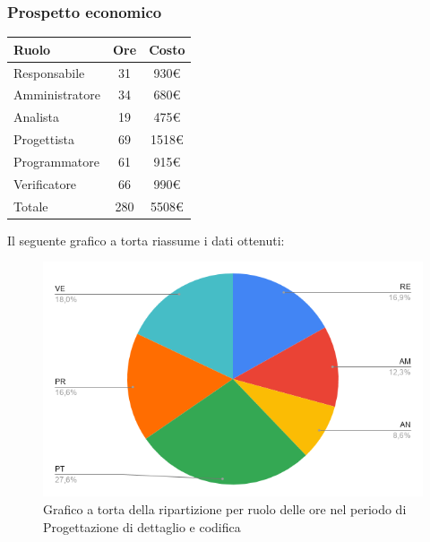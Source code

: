 {{{{{{{{{{{		\subsubsection{Prospetto economico}\label{PreventivoFaseDiProgettazioneDiDettaglioECodificaProspettoEconomicoPeriodo2}
		\quad
		\def\tabularxcolumn#1{m{#1}}
		{
			\begin{center}
				\renewcommand{\arraystretch}{1.4}
				\begin{tabularx}{7cm}{|X|c|c|}
					\hline
					\rowcolor{airforceblue}
					\textbf{Ruolo} & \textbf{Ore} & \textbf{Costo}\\
					\hline
					Responsabile & 31 & 930\euro\\
					\hline
					Amministratore & 34 & 680\euro\\
					\hline
					Analista & 19 & 475\euro\\
					\hline
					Progettista & 69 & 1518\euro\\
					\hline
					Programmatore & 61 & 915\euro\\
					\hline
					Verificatore & 66 & 990\euro\\
					\hline
					Totale & 280 & 5508\euro\\
					\hline
				\end{tabularx}
			\end{center}
			
			Il seguente grafico a torta riassume i dati ottenuti:
			\begin{figure}[!ht]
				\begin{center}
					\includegraphics[width=0.8\linewidth]{../immagini/pdp/torta_progettazione_dettaglio.png}
					\caption{Grafico a torta della ripartizione per ruolo delle ore nel periodo di Progettazione
						di dettaglio e codifica}
				\end{center}
			\end{figure}

}}}}}}}}}}}}
